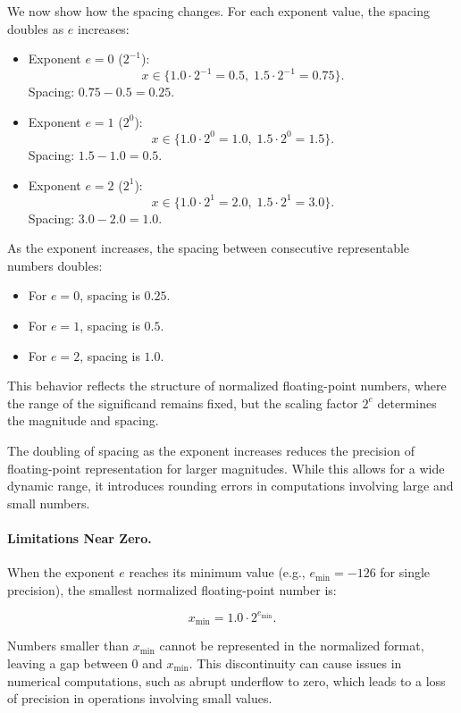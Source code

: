 We now show how the spacing changes. For each exponent value, the spacing doubles as \( e \) increases:

\begin{itemize}
    \item Exponent \( e = 0 \) (\( 2^{-1} \)):
    \[
    x \in \{1.0 \cdot 2^{-1} = 0.5, \; 1.5 \cdot 2^{-1} = 0.75\}.
    \]
    Spacing: \( 0.75 - 0.5 = 0.25 \).

    \item Exponent \( e = 1 \) (\( 2^{0} \)):
    \[
    x \in \{1.0 \cdot 2^0 = 1.0, \; 1.5 \cdot 2^0 = 1.5\}.
    \]
    Spacing: \( 1.5 - 1.0 = 0.5 \).

    \item Exponent \( e = 2 \) (\( 2^{1} \)):
    \[
    x \in \{1.0 \cdot 2^1 = 2.0, \; 1.5 \cdot 2^1 = 3.0\}.
    \]
    Spacing: \( 3.0 - 2.0 = 1.0 \).
\end{itemize}

As the exponent increases, the spacing between consecutive representable numbers doubles:
\begin{itemize}
    \item For \( e = 0 \), spacing is \( 0.25 \).
    \item For \( e = 1 \), spacing is \( 0.5 \).
    \item For \( e = 2 \), spacing is \( 1.0 \).
\end{itemize}

This behavior reflects the structure of normalized floating-point numbers, where the range of the significand remains fixed, but the scaling factor \( 2^e \) determines the magnitude and spacing.

The doubling of spacing as the exponent increases reduces the precision of floating-point representation for larger magnitudes. While this allows for a wide dynamic range, it introduces rounding errors in computations involving large and small numbers.

\paragraph{Limitations Near Zero.}
When the exponent \( e \) reaches its minimum value (e.g., \( e_{\text{min}} = -126 \) for single precision), the smallest normalized floating-point number is:

\[
x_{\text{min}} = 1.0 \cdot 2^{e_{\text{min}}}.
\]

Numbers smaller than \( x_{\text{min}} \) cannot be represented in the normalized format, leaving a gap between \( 0 \) and \( x_{\text{min}} \). This discontinuity can cause issues in numerical computations, such as abrupt underflow to zero, which leads to a loss of precision in operations involving small values.

